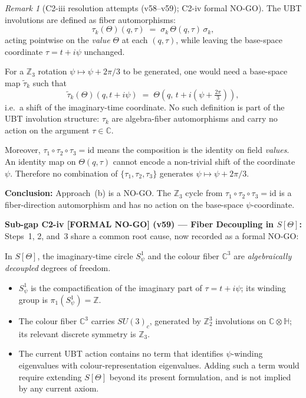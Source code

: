 \documentclass[12pt,a4paper]{article}
\theoremstyle{definition}
\theoremstyle{remark}
\newtheorem{remark}[theorem]{Remark}
\begin{document}
\begin{remark}[C2-iii resolution attempts (v58–v59); C2-iv formal NO-GO]
The UBT involutions are defined as fiber automorphisms:
\[
  \tau_k(\Theta)(q,\tau) \;=\; \sigma_k\,\Theta(q,\tau)\,\sigma_k,
\]
acting pointwise on the \emph{value} $\Theta$ at each $(q,\tau)$, while
leaving the base-space coordinate $\tau=t+i\psi$ unchanged.

For a $\mathbb{Z}_3$ rotation $\psi\mapsto\psi+2\pi/3$ to be generated, one
would need a base-space map $\widetilde{\tau}_k$ such that
\[
  \widetilde{\tau}_k(\Theta)(q,t+i\psi)
  \;=\;
  \Theta\!\left(q,\,t+i\!\left(\psi+\tfrac{2\pi}{3}\right)\right),
\]
i.e.\ a shift of the imaginary-time coordinate.  No such definition is part
of the UBT involution structure: $\tau_k$ are algebra-fiber automorphisms and
carry no action on the argument $\tau\in\mathbb{C}$.

Moreover, $\tau_1\circ\tau_2\circ\tau_3=\mathrm{id}$ means the composition
is the identity on field \emph{values}.  An identity map on $\Theta(q,\tau)$
cannot encode a non-trivial shift of the coordinate $\psi$.  Therefore no
combination of $\{\tau_1,\tau_2,\tau_3\}$ generates $\psi\mapsto\psi+2\pi/3$.

\textbf{Conclusion:} Approach~(b) is a NO-GO.  The $\mathbb{Z}_3$ cycle from
$\tau_1\circ\tau_2\circ\tau_3=\mathrm{id}$ is a fiber-direction automorphism
and has no action on the base-space $\psi$-coordinate.

\medskip

\noindent\textbf{Sub-gap C2-iv [FORMAL NO-GO] (v59) — Fiber Decoupling in $S[\Theta]$:}
Steps~1, 2, and~3 share a common root cause, now recorded as a formal NO-GO:

In $S[\Theta]$, the imaginary-time circle $S^1_\psi$ and the colour
fiber $\mathbb{C}^3$ are \emph{algebraically decoupled} degrees of freedom.
\begin{itemize}
  \item[(a)] $S^1_\psi$ is the compactification of the imaginary part of
    $\tau=t+i\psi$; its winding group is $\pi_1(S^1_\psi)=\mathbb{Z}$.
  \item[(b)] The colour fiber $\mathbb{C}^3$ carries $SU(3)_c$, generated
    by $\mathbb{Z}_2^3$ involutions on $\mathbb{C}\otimes\mathbb{H}$;
    its relevant discrete symmetry is $\mathbb{Z}_3$.
  \item[(c)] The current UBT action contains no term that identifies
    $\psi$-winding eigenvalues with colour-representation eigenvalues.
    Adding such a term would require extending $S[\Theta]$ beyond its
    present formulation, and is not implied by any current axiom.
\end{itemize}


\end{remark}
\end{document}
